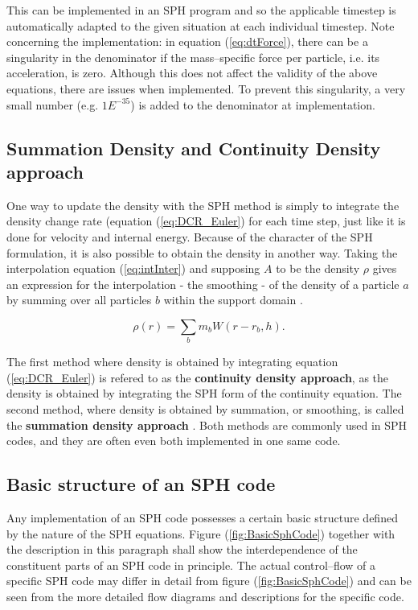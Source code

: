 \documentclass{report}
\begin{document}
This can be implemented in an SPH program and so the applicable timestep is automatically adapted to the given situation at each individual timestep. 
Note concerning the implementation: in equation (\ref{eq:dtForce}), there can be a singularity in the denominator if the mass--specific force per particle, i.e. its acceleration, is zero. Although this does not affect the validity of the above equations, there are issues when implemented. To prevent this singularity, a very small number (e.g. $1E^{-35}$) is added to the denominator at implementation.




\subsection{Summation Density and Continuity Density approach}
\label{sec:DensCalcMode}
One way to update the density with the SPH method is simply to integrate the density 
change rate (equation (\ref{eq:DCR_Euler}) for each time step, just like it is done for velocity 
and internal energy. Because of the character of the SPH formulation, it is also  
possible to obtain the density in another way. Taking the interpolation equation 
(\ref{eq:intInter}) and supposing $A$ to be the density $\rho$ gives an expression for 
the interpolation - the smoothing - of the density of a particle $a$ by summing over 
all particles $b$ within the support domain \cite{Monaghan2005}.

\begin{equation}
\label{eq:SumDensity}
\rho(r)=\sum_b m_b W(r-r_b,h).
\end{equation}

The first method where density is obtained by integrating equation (\ref{eq:DCR_Euler}) is refered 
to as the {\bf continuity density approach}, as the density is obtained by integrating the SPH form of the continuity equation. The second method, where density is obtained by 
summation, or smoothing, is called the {\bf summation density approach} \cite{Liu2003}. 
Both methods are commonly used in SPH codes, and they are often even both implemented 
in one same code. 

\subsection{Basic structure of an SPH code}

Any implementation of an SPH code possesses a certain basic structure defined by the 
nature of the SPH equations. Figure (\ref{fig:BasicSphCode}) together with the description in this paragraph shall show the interdependence of the 
constituent parts of an SPH code in principle. The actual control--flow of a specific
SPH code may differ in detail from figure (\ref{fig:BasicSphCode}) and can be seen 
from the more detailed flow diagrams and descriptions for the specific code.
\end{document}
